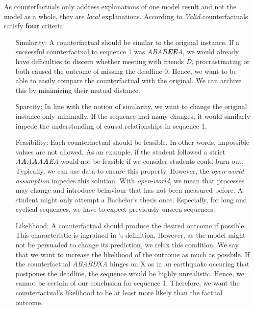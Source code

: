 \documentclass[./../../paper.tex]{subfiles}
\begin{document}
As counterfactuals only address explanations of one model result and not the model as a whole, they are \emph{local} explanations\autocite[p. 212]{molnar2019}. According to \citeauthor{molnar2019} \emph{Valid} counterfactuals satisfy \textbf{four} criteria\autocite[p. 212]{molnar2019}:

\begin{itemize}
    \item[Similarity:] A counterfactual should be similar to the original instance. If a sucsessful counterfactual to sequence 1 was \textit{ABAB\textbf{EE}A}, we would already have difficulties to discern whether meeting with friends \textit{D}, procrastinating  or both caused the outcome of missing the deadline 0. Hence, we want to be able to easily compare the counterfactual with the original. We can archive this by minimizing their mutual distance.
    \item[Sparcity:] In line with the notion of similarity, we want to change the original instance only minimally. If the sequence had many changes, it would similarly impede the understanding of causal relationships in sequence 1. 
    \item[Feasibility:] Each counterfactual should be feasible. In other words, impossible values are not allowed. As an example, if the student followed a strict \textit{A\textbf{A}A\textbf{A}A\textbf{A}EA} would not be feasible if we consider students could burn-out. Typically, we can use data to ensure this property. However, the \emph{open-world assumption} impedes this solution. With \emph{open-world}, we mean that processes may change and introduce behaviour that has not been measured before. A student might only attempt a Bachelor's thesis once. Especially, for long and cyclical sequences, we have to expect previously unseen sequences.  
    \item[Likelihood:] A counterfactual should produce the desired outcome if possible. This characteristic is ingrained in \citeauthor{molnar2019}'s definition. However, as the model might not be persuaded to change its prediction, we relax this condition. We say that we want to increase the likelihood of the outcome as much as possbile. If the counterfactual \textit{ABABDXA} hinges on X as in an earthquake occuring that postpones the deadline, the sequence would be highly unrealistic. Hence, we cannot be certain of our conclusion for sequence 1. Therefore, we want the counterfactual's likelihood to be at least more likely than the factual outcome. 
\end{itemize}
\end{document}
